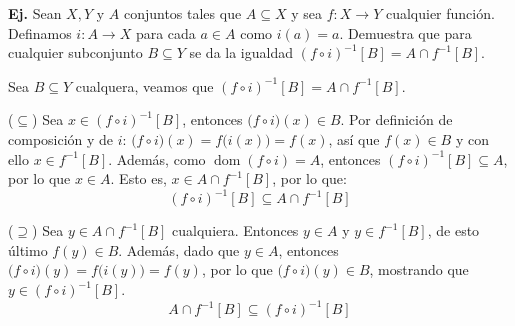 \documentclass[letterpaper,DIV=14,headsepline,12pt]{scrartcl}
\makeatletter
\newcounter{Ejer}
\newcommand{\pts}{}
\newenvironment{ejercicio}[1]{\noindent
    \ifthenelse{\equal{#1}{1} \OR \equal{#1}{+1}}{\renewcommand{\pts}{\textbf{(#1 pt)}}}{\renewcommand{\pts}{\textbf{(#1 pts)}}}\textbf{Ej. \theEjer} \pts\stepcounter{Ejer}}{\vspace{.3cm}}
\DeclareMathOperator{\dom}{dom}
\renewenvironment{proof}[1][]{%
        \par\pushQED{\qed}%
        \normalfont\topsep6pt \partopsep0pt %
        \trivlist
        \item[\hskip\labelsep
                \textbf{\textit{Demostración.}}%
        ]#1
        }{%
        \popQED\endtrivlist\@endpefalse
    }
\makeatother
\begin{document}
    \begin{ejercicio}{2.5}
        Sean $X,Y$ y $A$ conjuntos tales que $A \subseteq X$ y sea $f:X \to Y$ cualquier función. Definamos $i:A \to X $ para cada $a \in A$ como $i(a)=a$. Demuestra que para cualquier subconjunto $B \subseteq Y$ se da la igualdad $(f \circ i)^{-1}[B]=A \cap f^{-1}[B]$.
    \end{ejercicio}
    \begin{proof}
        Sea $B \subseteq Y$ cualquera, veamos que $(f \circ i)^{-1}[B]=A \cap f^{-1}[B]$.

        ($\subseteq$) Sea $x \in (f \circ i)^{-1}[B]$, entonces $\big( f \circ i \big)(x) \in B$. Por definición de composición y de $i$: $\big( f \circ i \big)(x) = f\big( i(x) \big)=f(x)$, así que $f(x) \in B$ y con ello $x \in f^{-1}[B]$. Además, como $\dom(f \circ i)=A$, entonces $(f \circ i)^{-1}[B] \subseteq A$, por lo que $x \in A$. Esto es, $x \in A \cap f^{-1}[B]$, por lo que:
        \[(f \circ i)^{-1}[B] \subseteq A \cap f^{-1}[B]\]

        ($\supseteq$) Sea $y \in A \cap f^{-1}[B]$ cualquiera. Entonces $y \in A$ y $y \in f^{-1}[B]$, de esto último $f(y) \in B$. Además, dado que $y \in A$, entonces $\big( f \circ i \big)(y) = f\big( i(y) \big)=f(y)$, por lo que $\big( f \circ i \big)(y) \in B$, mostrando que $y \in (f \circ i)^{-1}[B]$.
        \[A \cap f^{-1}[B] \subseteq (f \circ i)^{-1}[B]\]
    \end{proof}
    
\end{document}
